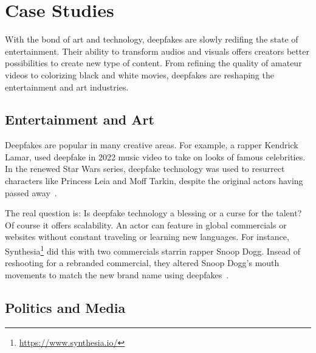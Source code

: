 
\chapter{Case Studies}\label{chapter:applications}
With the bond of art and technology, deepfakes are slowly redifing the state of 
entertainment. Their ability to transform audios and visuals offers creators better
possibilities to create new type of content. From refining the quality of amateur
videos to colorizing black and white movies, deepfakes are reshaping the entertainment
and art industries. 


\section{Entertainment and Art}
Deepfakes are popular in many creative areas. For example, a rapper Kendrick Lamar,
used deepfake in 2022 music video to take on looks of famous celebrities. In the 
renewed Star Wars series, deepfake technology was used to resurrect characters like
Princess Leia and Moff Tarkin, despite the original actors having passed away~\cite{motion-analysis}. 

The real question is: Is deepfake technology a blessing or a curse for the talent?
Of course it offers scalability. An actor can feature in global commercials or websites
without constant traveling or learning new languages. For instance, Synthesia\footnote{\url{https://www.synthesia.io/}}
did this with two commercials starrin rapper Snoop Dogg. Insead of reshooting for a
rebranded commercial, they altered Snoop Dogg's mouth movements to match the new brand 
name using deepfakes~\cite{wipo-magazine}.

\section{Politics and Media}